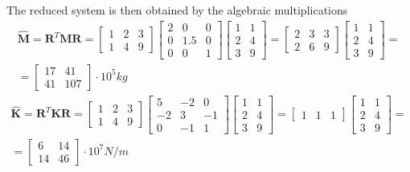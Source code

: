 \begin{Answer}[ref={three_storey_helicopter}]
The reduced system is then obtained by the algebraic multiplications
\begin{multline*}
\hat{\mathbf{M}} = \mathbf{R}^T \mathbf{M} \mathbf{R} =
\begin{bmatrix}
    1 & 2 & 3 \\
    1 & 4 & 9
\end{bmatrix}
\begin{bmatrix}
    2 & 0 & 0 \\
    0 & 1.5 & 0 \\
    0 & 0 & 1
\end{bmatrix}
\begin{bmatrix}
    1 & 1 \\
    2 & 4 \\
    3 & 9
\end{bmatrix} =
\begin{bmatrix}
    2 & 3 & 3 \\
    2 & 6 & 9
\end{bmatrix}
\begin{bmatrix}
    1 & 1 \\
    2 & 4 \\
    3 & 9
\end{bmatrix} = \\
= \begin{bmatrix}
    17 & 41 \\
    41 & 107
\end{bmatrix} \cdot 10^5 kg
\end{multline*}
\begin{multline*}
\hat{\mathbf{K}} = \mathbf{R}^T \mathbf{K} \mathbf{R} =
\begin{bmatrix}
    1 & 2 & 3 \\
    1 & 4 & 9
\end{bmatrix}
\begin{bmatrix}
    5 & -2 & 0 \\
    -2 & 3 & -1 \\
    0 & -1 & 1
\end{bmatrix}
\begin{bmatrix}
    1 & 1 \\
    2 & 4 \\
    3 & 9
\end{bmatrix} =
\begin{bmatrix}
    1 & 1 & 1
\end{bmatrix}
\begin{bmatrix}
    1 & 1 \\
    2 & 4 \\
    3 & 9
\end{bmatrix} = \\
= \begin{bmatrix}
    6 & 14 \\
    14 & 46
\end{bmatrix} \cdot 10^7 N/m
\end{multline*}


\end{Answer}
